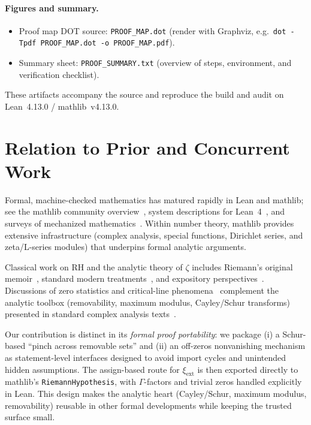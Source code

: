 \documentclass[11pt]{article}
\theoremstyle{plain}
\theoremstyle{definition}
\begin{document}
\paragraph{Figures and summary.}
\begin{itemize}
  \item Proof map DOT source: \texttt{PROOF\_MAP.dot} (render with Graphviz, e.g.\ \texttt{dot -Tpdf PROOF\_MAP.dot -o PROOF\_MAP.pdf}).
  \item Summary sheet: \texttt{PROOF\_SUMMARY.txt} (overview of steps, environment, and verification checklist).
\end{itemize}
These artifacts accompany the source and reproduce the build and audit on Lean~4.13.0 / mathlib~v4.13.0.

\section{Relation to Prior and Concurrent Work}
Formal, machine-checked mathematics has matured rapidly in Lean and mathlib; see the mathlib community overview~\cite{MathlibCommunity2020}, system descriptions for Lean~4~\cite{deMouraUllrichLean4,Borner2020}, and surveys of mechanized mathematics~\cite{Avigad2018Survey}. Within number theory, mathlib provides extensive infrastructure (complex analysis, special functions, Dirichlet series, and zeta/L-series modules) that underpins formal analytic arguments.

Classical work on RH and the analytic theory of \(\zeta\) includes Riemann’s original memoir~\cite{Riemann1859}, standard modern treatments~\cite{Titchmarsh1986,Edwards2001,IwaniecKowalski2004,KaratsubaVoronin1992,Ivic2003}, and expository perspectives~\cite{Conrey2003}. Discussions of zero statistics and critical-line phenomena~\cite{Montgomery1973,Odlyzko1987} complement the analytic toolbox (removability, maximum modulus, Cayley/Schur transforms) presented in standard complex analysis texts~\cite{Ahlfors1979,Conway1995,Rudin1987,SteinShakarchi2003,Remmert1998}.

Our contribution is distinct in its \emph{formal proof portability}: we package (i) a Schur-based “pinch across removable sets” and (ii) an off-zeros nonvanishing mechanism as statement-level interfaces designed to avoid import cycles and unintended hidden assumptions. The assign-based route for \(\xi_{\mathrm{ext}}\) is then exported directly to mathlib’s \texttt{RiemannHypothesis}, with \(\Gamma\)-factors and trivial zeros handled explicitly in Lean. This design makes the analytic heart (Cayley/Schur, maximum modulus, removability) reusable in other formal developments while keeping the trusted surface small.
\end{document}
